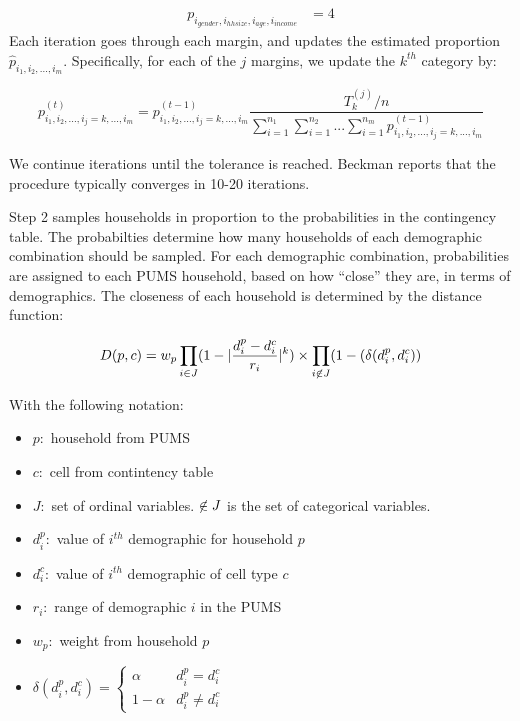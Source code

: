 \documentclass{article}
\begin{document}
		\begin{align*}
		 p_{i_{gender}, i_{hhsize}, i_{age}, i_{income}} &= 4
		\end{align*}
		Each iteration goes through each margin, and updates the estimated proportion $\hat{p}_{i_1, i_2, ..., i_m}$. Specifically, for each of the $j$ margins, we update the $k^{th}$ category by:

		\begin{equation}
			p_{i_1, i_2, ...,i_j = k, ...,i_m}^{(t)} = p_{i_1, i_2, ...,i_j = k, ...,i_m}^{(t - 1)} \frac{T_{k}^{(j)} / n}{\sum_{i = 1}^{n_1} \sum_{i = 1}^{n_2} ... \sum_{i = 1}^{n_m} p_{i_1, i_2, ...,i_j = k, ...,i_m}^{(t - 1)}}
		\end{equation}

		We continue iterations until the tolerance is reached. Beckman \cite{beckman1996creating} reports that the procedure typically converges in 10-20 iterations.

		Step 2 samples households in proportion to the probabilities in the contingency table. The probabilties determine how many households of each demographic combination should be sampled. For each demographic combination, probabilities are assigned to each PUMS household, based on how ``close'' they are, in terms of demographics. The closeness of each household is determined by the distance function:

		\begin{equation}
			D(p, c) = w_p \prod_{i \in J} (1 - |\frac{d_i^p - d_i^c}{r_i}|^k) \times \prod_{i \centernot\in J} (1 - (\delta(d_i^p, d_i^c))
		\end{equation}

		With the following notation:

		\begin{itemize}
			\item $p: $ household from PUMS  
			\item $c: $ cell from contintency table
			\item $J: $ set of ordinal variables. $\centernot\in J$ is the set of categorical variables.
			\item $d_i^p: $ value of $i^{th}$ demographic for household $p$
			\item $d_i^c: $ value of $i^{th}$ demographic of cell type $c$
			\item $r_i: $ range of demographic $i$ in the PUMS 
			\item $w_p: $ weight from household $p$
			\item $\delta(d_i^p, d_i^c) = \begin{cases} \alpha & d_i^p = d_i^c \\ 1 - \alpha & d_i^p \neq d_i^c \end{cases} $
		\end{itemize}
\end{document}

